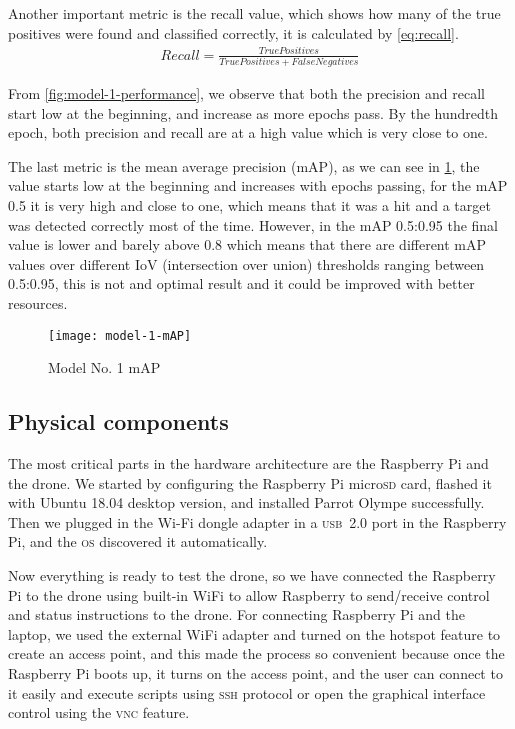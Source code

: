 \documentclass[../main.tex]{subfiles}
\begin{document}
Another important metric is the recall value, which shows how many of the 
true positives were found and classified correctly, it is calculated by \cref{eq:recall}.
%
\begin{align}
    Recall =  \frac{True Positives}{True Positives + False Negatives} \label{eq:recall}
\end{align}

From \cref{fig:model-1-performance}, we observe that both the precision and recall start low 
at the beginning, and increase as more epochs pass. By the hundredth 
epoch, both precision and recall are at a high value which is very close 
to one.  

The last metric is the mean average precision (mAP), as we can see in 
\cref{fig:model-1-mAP}, the value starts low at the beginning and 
increases with epochs passing, for the mAP 0.5 it is very high and close
to one, which means that it was a hit and a target was detected 
correctly most of the time. However, in the mAP 0.5:0.95 the final value 
is lower and barely above 0.8 which means that there are different mAP 
values over different IoV (intersection over union) thresholds ranging 
between 0.5:0.95, this is not and optimal result and it could be 
improved with better resources.

\begin{figure}[tbp] 
	\centering
	\texttt{[image: model-1-mAP]} 
	\caption{Model No. 1 mAP} \label{fig:model-1-mAP} 
\end{figure}

\subsection{Physical components}

The most critical parts in the hardware
architecture are the Raspberry Pi and the drone. 
We started by configuring the Raspberry Pi micro\textsc{sd} card,
flashed it with Ubuntu 18.04 desktop version,
and installed Parrot Olympe successfully. 
Then we plugged in the Wi-Fi dongle adapter
in a \textsc{usb}~2.0 port in the Raspberry Pi, 
and the \textsc{os} discovered it automatically. 

Now everything is ready to test the 
\anafi drone, so we have connected the
Raspberry Pi to the drone using built-in WiFi
to allow Raspberry to send/receive control and status 
instructions to the drone. 
For connecting Raspberry Pi and the laptop, 
we used the external WiFi adapter and turned 
on the hotspot feature to create an access point,
and this made the process so convenient because 
once the Raspberry Pi boots up, it turns on the 
access point, and the user can connect to it 
easily and execute scripts using \textsc{ssh} 
protocol or open the graphical interface 
control using the \textsc{vnc} feature.
\end{document}
